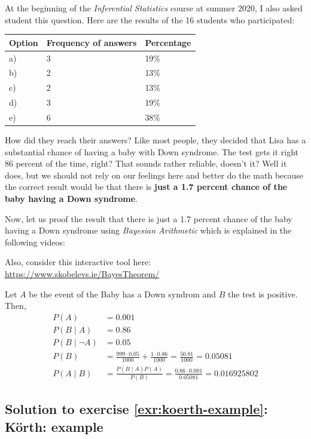 \documentclass[
  12pt,
  oneside]{book}
\theoremstyle{definition}
\theoremstyle{definition}
\theoremstyle{definition}
\theoremstyle{definition}
\theoremstyle{remark}
\begin{document}
At the beginning of the \emph{Inferential Statistics} course at summer 2020, I also asked student this question. Here are the results of the 16 students who participated:

\begin{longtable}[]{@{}lll@{}}
\toprule\noalign{}
Option & Frequency of answers & Percentage \\
\midrule\noalign{}
\endhead
\bottomrule\noalign{}
\endlastfoot
a) & 3 & 19\% \\
b) & 2 & 13\% \\
c) & 2 & 13\% \\
d) & 3 & 19\% \\
e) & 6 & 38\% \\
\end{longtable}

How did they reach their answers? Like most people, they decided that Lisa has a substantial chance of having a baby with Down syndrome. The test gets it right 86 percent of the time, right? That sounds rather reliable, doesn't it? Well it does, but we should not rely on our feelings here and better do the math because the correct result would be that there is \textbf{just a 1.7 percent chance of the baby having a Down syndrome}.

Now, let us proof the result that there is just a 1.7 percent chance of the baby having a Down syndrome using \emph{Bayesian Arithmetic} which is explained in the following videos:

Also, consider this interactive tool here: \url{https://www.skobelevs.ie/BayesTheorem/}

Let \(A\) be the event of the Baby has a Down syndrom and \(B\) the test is positive. Then,
\begin{align*}
    P(A)&=0.001\\
    P(B\mid A)&=0.86\\
    P(B\mid \neg A)&=0.05\\
    P(B)&=\frac{999\cdot 0.05}{1000}+\frac{1\cdot 0.86}{1000}=\frac{50.81}{1000}=0.05081\\
    P(A\mid B)&={\frac {P(B\mid A)P(A)}{P(B)}}=\frac{0.86 \cdot 0.001}{0.05081}=0.016925802
\end{align*}

\hypertarget{sol:koerth-example}{%
\subsection*{Solution to exercise \ref{exr:koerth-example}: Körth: example}\label{sol:koerth-example}}
\end{document}
